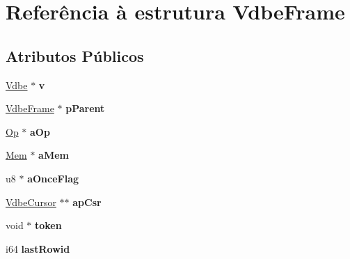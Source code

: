 \hypertarget{struct_vdbe_frame}{\section{Referência à estrutura Vdbe\-Frame}
\label{struct_vdbe_frame}
}
\subsection*{Atributos Públicos}
\begin{DoxyCompactItemize}
\item 
\hypertarget{struct_vdbe_frame_a2f6258356959c94398d1d006a740c4ce}{\hyperlink{struct_vdbe}{Vdbe} $\ast$ {\bfseries v}}\label{struct_vdbe_frame_a2f6258356959c94398d1d006a740c4ce}

\item 
\hypertarget{struct_vdbe_frame_afb11d8aa920f34720333f52737375d59}{\hyperlink{struct_vdbe_frame}{Vdbe\-Frame} $\ast$ {\bfseries p\-Parent}}\label{struct_vdbe_frame_afb11d8aa920f34720333f52737375d59}

\item 
\hypertarget{struct_vdbe_frame_a0e5670c52e8eeb7e66bf1e3bff8ce2b5}{\hyperlink{struct_vdbe_op}{Op} $\ast$ {\bfseries a\-Op}}\label{struct_vdbe_frame_a0e5670c52e8eeb7e66bf1e3bff8ce2b5}

\item 
\hypertarget{struct_vdbe_frame_a98b9eabf633e77d4ae2dfe9d13a43fdf}{\hyperlink{struct_mem}{Mem} $\ast$ {\bfseries a\-Mem}}\label{struct_vdbe_frame_a98b9eabf633e77d4ae2dfe9d13a43fdf}

\item 
\hypertarget{struct_vdbe_frame_a92608c14f2aa3be81e65d59000ef8bd8}{u8 $\ast$ {\bfseries a\-Once\-Flag}}\label{struct_vdbe_frame_a92608c14f2aa3be81e65d59000ef8bd8}

\item 
\hypertarget{struct_vdbe_frame_a5d373b3a195dbd1a31f5aa0dbe1822ee}{\hyperlink{struct_vdbe_cursor}{Vdbe\-Cursor} $\ast$$\ast$ {\bfseries ap\-Csr}}\label{struct_vdbe_frame_a5d373b3a195dbd1a31f5aa0dbe1822ee}

\item 
\hypertarget{struct_vdbe_frame_a11de10011ea2164995c6b616bba8a576}{void $\ast$ {\bfseries token}}\label{struct_vdbe_frame_a11de10011ea2164995c6b616bba8a576}

\item 
\hypertarget{struct_vdbe_frame_af655193217fb53c7acab9d24c94344aa}{i64 {\bfseries last\-Rowid}}\label{struct_vdbe_frame_af655193217fb53c7acab9d24c94344aa}


\end{DoxyCompactItemize}
